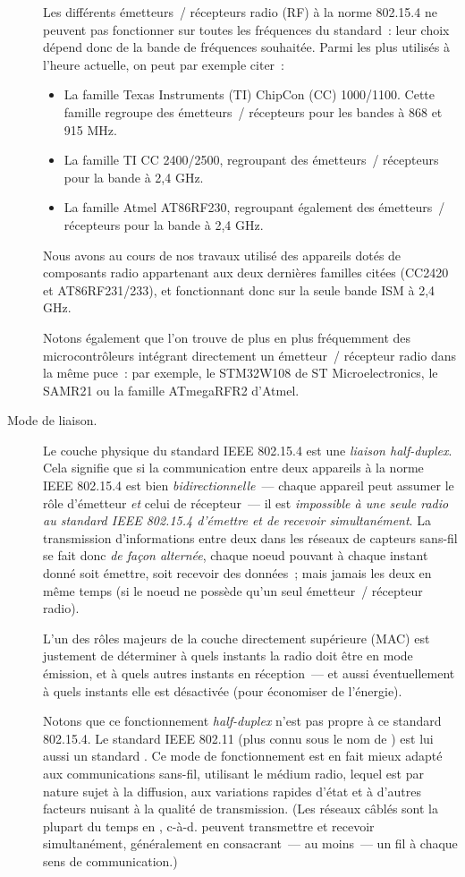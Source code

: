 \begin{description}
Les différents émetteurs~/ récepteurs radio (RF) à la norme 802.15.4 ne
peuvent pas fonctionner sur toutes les fréquences du standard~: leur choix
dépend donc de la bande de fréquences souhaitée.
Parmi les plus utilisés à l'heure actuelle, on peut par exemple citer~:
\begin{itemize}
\item La famille Texas Instruments (TI) ChipCon (CC) 1000/1100. Cette famille
regroupe des émetteurs~/ récepteurs pour les bandes à 868 et 915 MHz.
\item La famille TI CC 2400/2500, regroupant des émetteurs~/ récepteurs pour
la bande à 2,4 GHz.
\item La famille Atmel AT86RF230, regroupant également des émetteurs~/
récepteurs pour la bande à 2,4 GHz.
\end{itemize}
Nous avons au cours de nos travaux utilisé des appareils dotés de
composants radio appartenant aux deux dernières familles citées (CC2420
et AT86RF231/233), et fonctionnant donc sur la seule bande ISM à 2,4 GHz.

Notons également que l'on trouve de plus en plus fréquemment des
microcontrôleurs intégrant directement un émetteur~/ récepteur radio
dans la même puce~: par exemple, le STM32W108 de ST Microelectronics,
le SAMR21 ou la famille ATmegaRFR2 \cite{DSATmegaRFR2} d'Atmel.

\item[Mode de liaison.]
Le couche physique du standard IEEE 802.15.4 est une \emph{liaison
half-duplex}. Cela signifie que si la communication entre deux appareils
à la norme IEEE 802.15.4 est bien \emph{bidirectionnelle}~--- chaque
appareil peut assumer le rôle d'émetteur \emph{et} celui de récepteur~---
il est \emph{impossible à une seule radio au standard IEEE 802.15.4 d'émettre
et de recevoir simultanément}. La transmission d'informations entre deux
 dans les réseaux de capteurs sans-fil se fait donc \emph{de
façon alternée}, chaque noeud pouvant à chaque instant donné soit émettre,
soit recevoir des données~; mais jamais les deux en même temps (si le
noeud ne possède qu'un seul émetteur~/ récepteur radio).

L'un des rôles majeurs de la couche directement supérieure (MAC) est
justement de déterminer à quels instants la radio doit être en mode émission,
et à quels autres instants en réception~--- et aussi éventuellement à quels
instants elle est désactivée (pour économiser de l'énergie).

Notons que ce fonctionnement \emph{half-duplex} n'est pas propre à ce
standard 802.15.4. Le standard IEEE 802.11 (plus connu sous le nom de
) est lui aussi un standard . Ce mode
de fonctionnement est en fait mieux adapté aux communications sans-fil,
utilisant le médium radio, lequel est par nature sujet à la diffusion,
aux variations rapides d'état et à d'autres facteurs nuisant à la qualité
de transmission. (Les réseaux câblés sont la plupart du temps en
, c-à-d. peuvent transmettre et recevoir simultanément,
généralement en consacrant~--- au moins~--- un fil à chaque sens
de communication.)


\end{description}
